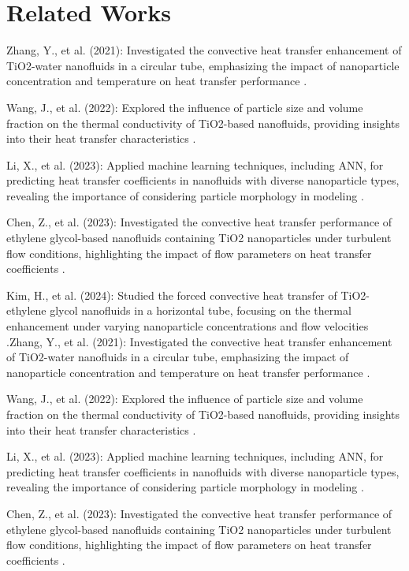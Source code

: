 \documentclass{article}
\begin{document}
\section{Related Works}

Zhang, Y., et al. (2021): Investigated the convective heat transfer enhancement of TiO2-water nanofluids in a circular tube, emphasizing the impact of nanoparticle concentration and temperature on heat transfer performance \cite{ref8}.

Wang, J., et al. (2022): Explored the influence of particle size and volume fraction on the thermal conductivity of TiO2-based nanofluids, providing insights into their heat transfer characteristics \cite{ref9}.

Li, X., et al. (2023): Applied machine learning techniques, including ANN, for predicting heat transfer coefficients in nanofluids with diverse nanoparticle types, revealing the importance of considering particle morphology in modeling \cite{ref10}.

Chen, Z., et al. (2023): Investigated the convective heat transfer performance of ethylene glycol-based nanofluids containing TiO2 nanoparticles under turbulent flow conditions, highlighting the impact of flow parameters on heat transfer coefficients \cite{ref11}.

Kim, H., et al. (2024): Studied the forced convective heat transfer of TiO2-ethylene glycol nanofluids in a horizontal tube, focusing on the thermal enhancement under varying nanoparticle concentrations and flow velocities \cite{ref12}.Zhang, Y., et al. (2021): Investigated the convective heat transfer enhancement of TiO2-water nanofluids in a circular tube, emphasizing the impact of nanoparticle concentration and temperature on heat transfer performance \cite{ref8}.

Wang, J., et al. (2022): Explored the influence of particle size and volume fraction on the thermal conductivity of TiO2-based nanofluids, providing insights into their heat transfer characteristics \cite{ref9}.

Li, X., et al. (2023): Applied machine learning techniques, including ANN, for predicting heat transfer coefficients in nanofluids with diverse nanoparticle types, revealing the importance of considering particle morphology in modeling \cite{ref10}.

Chen, Z., et al. (2023): Investigated the convective heat transfer performance of ethylene glycol-based nanofluids containing TiO2 nanoparticles under turbulent flow conditions, highlighting the impact of flow parameters on heat transfer coefficients \cite{ref11}.
\end{document}
